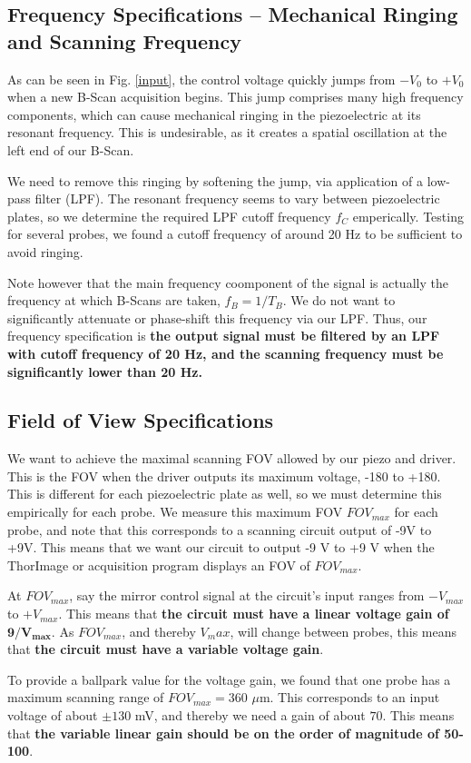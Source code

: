\documentclass{article}
\begin{document}
\subsection{Frequency Specifications -- Mechanical Ringing and Scanning Frequency}
\par{As can be seen in Fig. \ref{input}, the control voltage quickly jumps from $-V_0$ to $+V_0$ when a new B-Scan acquisition begins. This jump comprises many high frequency components, which can cause mechanical ringing in the piezoelectric at its resonant frequency. This is undesirable, as it creates a spatial oscillation at the left end of our B-Scan.}
\par{We need to remove this ringing by softening the jump, via application of a low-pass filter (LPF). The resonant frequency seems to vary between piezoelectric plates, so we determine the required LPF cutoff frequency $f_C$ emperically. Testing for several probes, we found a cutoff frequency of around 20 Hz to be sufficient to avoid ringing.}
\par{Note however that the main frequency coomponent of the signal is actually the frequency at which B-Scans are taken, $f_B = 1/T_B$. We do not want to significantly attenuate or phase-shift this frequency via our LPF. Thus, our frequency specification is \textbf{the output signal must be filtered by an LPF with cutoff frequency of 20 Hz, and the scanning frequency must be significantly lower than 20 Hz.}}
\subsection{Field of View Specifications}
\par{We want to achieve the maximal scanning FOV allowed by our piezo and driver. This is the FOV when the driver outputs its maximum voltage, -180 to +180. This is different for each piezoelectric plate as well, so we must determine this empirically for each probe. We measure this maximum FOV $FOV_{max}$ for each probe, and note that this corresponds to a scanning circuit output of -9V to +9V. This means that we want our circuit to output -9 V to +9 V when the ThorImage or acquisition program displays an FOV of $FOV_{max}$.}
\par{At $FOV_{max}$, say the mirror control signal at the circuit's input ranges from $-V_{max}$ to $+V_{max}$. This means that \textbf{the circuit must have a linear voltage gain of $\mathbf{9/V_{max}}$}. As $FOV_{max}$, and thereby $V_max$, will change between probes, this means that \textbf{the circuit must have a variable voltage gain}.}
\par{To provide a ballpark value for the voltage gain, we found that one probe has a maximum scanning range of $FOV_{max} =360$ $\mu$m. This corresponds to an input voltage of about $\pm 130$ mV, and thereby we need a gain of about $70$. This means that \textbf{the variable linear gain should be on the order of magnitude of 50-100}.}
\end{document}
